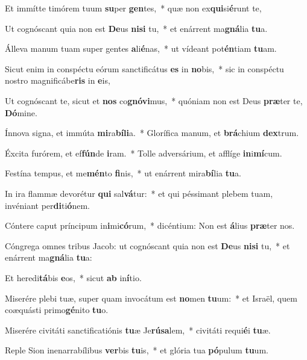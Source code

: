 \item Et immítte timórem tuum \textbf{su}per \textbf{gen}tes,~* quæ non ex\textbf{qui}si\textbf{é}runt te,
\item Ut cognóscant quia non est \textbf{De}us \textbf{ni}\textbf{si} tu,~* et enárrent ma\textbf{gná}lia \textbf{tu}a.
\item Álleva manum tuam super gentes \textbf{a}li\textbf{é}nas,~* ut vídeant pot\textbf{én}tiam \textbf{tu}am.
\item Sicut enim in conspéctu eórum sanctificátus \textbf{es} in \textbf{no}bis,~* sic in conspéctu nostro magnificábe\textbf{ris} in \textbf{e}is,
\item Ut cognóscant te, sicut et \textbf{nos} co\textbf{gnó}\textbf{vi}mus,~* quóniam non est Deus \textbf{præ}ter te, \textbf{Dó}mine.
\item Ínnova signa, et immúta \textbf{mi}ra\textbf{bí}\textbf{li}a.~* Glorífica manum, et \textbf{brá}chium \textbf{dex}trum.
\item Éxcita furórem, et ef\textbf{fún}de \textbf{i}ram.~* Tolle adversárium, et afflíge \textbf{in}i\textbf{mí}cum.
\item Festína tempus, et me\textbf{mén}to \textbf{fi}nis,~* ut enárrent mira\textbf{bí}lia \textbf{tu}a.
\item In ira flammæ devorétur \textbf{qui} sal\textbf{vá}tur:~* et qui péssimant plebem tuam, invéniant per\textbf{di}ti\textbf{ó}nem.
\item Cóntere caput príncipum in\textbf{i}mi\textbf{có}rum,~* dicéntium: Non est \textbf{á}lius \textbf{præ}ter nos.
\item Cóngrega omnes tribus Jacob: ut cognóscant quia non est \textbf{De}us \textbf{ni}\textbf{si} tu,~* et enárrent ma\textbf{gná}lia \textbf{tu}a:
\item Et heredi\textbf{tá}bis \textbf{e}os,~* sicut \textbf{ab} in\textbf{í}tio.
\item Miserére plebi tuæ, super quam invocátum est \textbf{no}men \textbf{tu}um:~* et Israël, quem coæquásti primo\textbf{gé}nito \textbf{tu}o.
\item Miserére civitáti sanctificatiónis \textbf{tu}æ Je\textbf{rú}\textbf{sa}lem,~* civitáti requi\textbf{é}i \textbf{tu}æ.
\item Reple Sion inenarrabílibus \textbf{ver}bis \textbf{tu}is,~* et glória tua \textbf{pó}pulum \textbf{tu}um.
